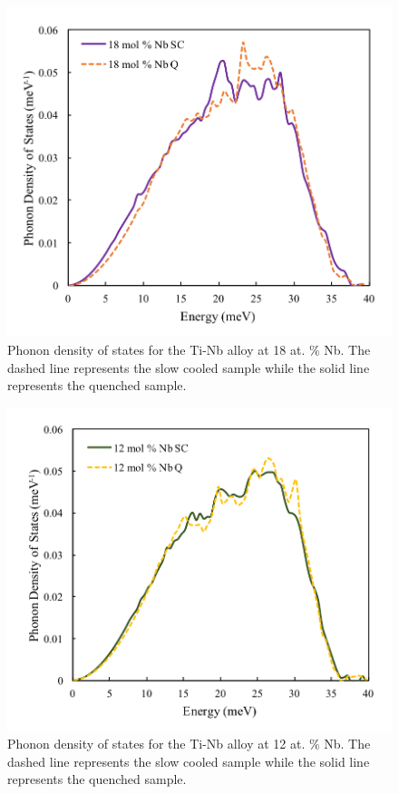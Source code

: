 \pagebreak
\begin{figure}[H]
	\centering
	\includegraphics[width=\textwidth]{Chapter-7/Figures/50dos18.png}
	\caption{Phonon density of states for the Ti-Nb alloy at 18 at. \% Nb. The dashed line represents the slow cooled sample while the solid line represents the quenched sample.}
	\label{Ch7-figure:50dos18}
\end{figure}

\pagebreak
\begin{figure}[H]
	\centering
	\includegraphics[width=\textwidth]{Chapter-7/Figures/50dos12.png}
	\caption{Phonon density of states for the Ti-Nb alloy at 12 at. \% Nb. The dashed line represents the slow cooled sample while the solid line represents the quenched sample.}
	\label{Ch7-figure:50dos12}
\end{figure}

